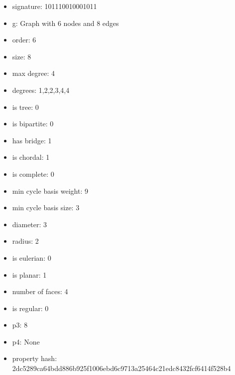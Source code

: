\begin{itemize}
\item signature: 101110010001011
\item g: Graph with 6 nodes and 8 edges
\item order: 6
\item size: 8
\item max degree: 4
\item degrees: 1,2,2,3,4,4
\item is tree: 0
\item is bipartite: 0
\item has bridge: 1
\item is chordal: 1
\item is complete: 0
\item min cycle basis weight: 9
\item min cycle basis size: 3
\item diameter: 3
\item radius: 2
\item is eulerian: 0
\item is planar: 1
\item number of faces: 4
\item is regular: 0
\item p3: 8
\item p4: None
\item property hash: 2dc5289ca64bdd886b925f1006ebd6c9713a25464c21edc8432fcf6414f528b4
\end{itemize}
\newpage
\begin{figure}
\end{figure}
